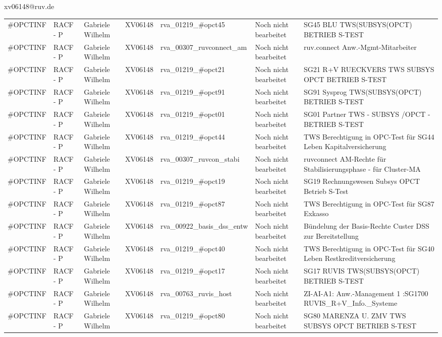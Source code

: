 \documentclass[a4paper,landscape,12pt]{letter}
\begin{document}
\begin{letter}{xv06148@ruv.de\hfill \break}
\begin{tiny}
\begin{longtable}{|p{35mm}|p{15mm}|p{25mm}|p{10mm}|p{40mm}|p{50mm}|p{50mm}|}
\#OPCTINF & RACF - P & Gabriele Wilhelm & XV06148 & rva\_01219\_\#opct45 & Noch nicht bearbeitet & SG45 BLU TWS(SUBSYS(OPCT) BETRIEB S-TEST \\
\#OPCTINF & RACF - P & Gabriele Wilhelm & XV06148 & rva\_00307\_ruvconnect\_am & Noch nicht bearbeitet & ruv.connect Anw.-Mgmt-Mitarbeiter \\
\#OPCTINF & RACF - P & Gabriele Wilhelm & XV06148 & rva\_01219\_\#opct21 & Noch nicht bearbeitet & SG21 R+V RUECKVERS TWS SUBSYS OPCT BETRIEB S-TEST \\
\#OPCTINF & RACF - P & Gabriele Wilhelm & XV06148 & rva\_01219\_\#opct91 & Noch nicht bearbeitet & SG91 Sysprog TWS(SUBSYS(OPCT) BETRIEB S-TEST \\
\#OPCTINF & RACF - P & Gabriele Wilhelm & XV06148 & rva\_01219\_\#opct01 & Noch nicht bearbeitet & SG01 Partner TWS - SUBSYS /OPCT - BETRIEB S-TEST \\
\#OPCTINF & RACF - P & Gabriele Wilhelm & XV06148 & rva\_01219\_\#opct44 & Noch nicht bearbeitet & TWS Berechtigung in OPC-Test für SG44 Leben Kapitalversicherung \\
\#OPCTINF & RACF - P & Gabriele Wilhelm & XV06148 & rva\_00307\_ruvcon\_stabi & Noch nicht bearbeitet & ruvconnect AM-Rechte für Stabilisierungsphase - für Cluster-MA \\
\#OPCTINF & RACF - P & Gabriele Wilhelm & XV06148 & rva\_01219\_\#opct19 & Noch nicht bearbeitet & SG19 Rechnungswesen Subsys OPCT Betrieb S-Test \\
\#OPCTINF & RACF - P & Gabriele Wilhelm & XV06148 & rva\_01219\_\#opct87 & Noch nicht bearbeitet & TWS Berechtigung in OPC-Test für SG87 Exkasso \\
\#OPCTINF & RACF - P & Gabriele Wilhelm & XV06148 & rva\_00922\_basis\_dss\_entw & Noch nicht bearbeitet & Bündelung der Basis-Rechte Custer DSS zur Bereitstellung \\
\#OPCTINF & RACF - P & Gabriele Wilhelm & XV06148 & rva\_01219\_\#opct40 & Noch nicht bearbeitet & TWS Berechtigung in OPC-Test für SG40 Leben Restkreditversicherung \\
\#OPCTINF & RACF - P & Gabriele Wilhelm & XV06148 & rva\_01219\_\#opct17 & Noch nicht bearbeitet & SG17 RUVIS TWS(SUBSYS(OPCT) BETRIEB S-TEST \\
\#OPCTINF & RACF - P & Gabriele Wilhelm & XV06148 & rva\_00763\_ruvis\_host & Noch nicht bearbeitet & ZI-AI-A1: Anw.-Management 1 :SG1700 RUVIS\_R+V\_Info.\_Systeme \\
\#OPCTINF & RACF - P & Gabriele Wilhelm & XV06148 & rva\_01219\_\#opct80 & Noch nicht bearbeitet & SG80 MARENZA U. ZMV TWS SUBSYS OPCT BETRIEB S-TEST \\

\end{longtable}
\end{tiny}
\end{letter}
\end{document}
